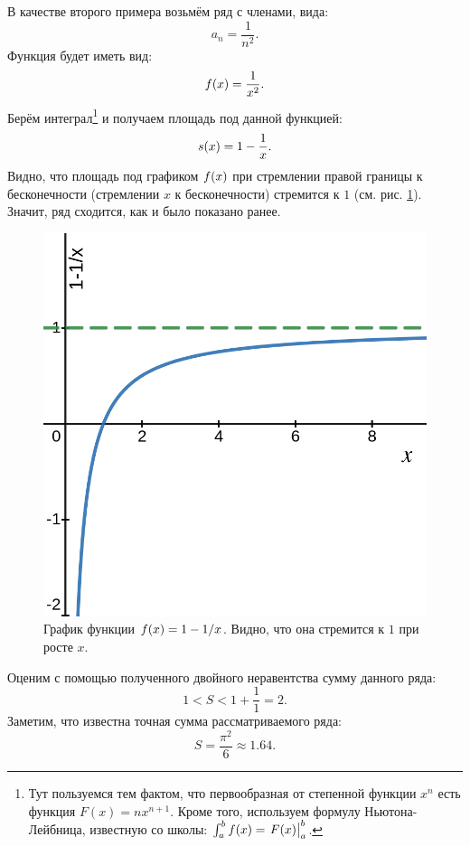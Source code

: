 \documentclass[12pt]{article}
\begin{document}
В качестве второго примера возьмём ряд с членами, вида:
\begin{equation}
    a_n = \dfrac{1}{n^2}.
\end{equation}
Функция будет иметь вид:
\begin{equation}
    f\qty(x) = \dfrac{1}{x^2}.
\end{equation}
Берём интеграл\footnote{Тут пользуемся тем фактом, что первообразная от степенной функции $x^n$ есть функция $F(x)=nx^{n+1}.$ Кроме того, используем формулу Ньютона\--Лейбница, известную со школы:
$ \int_a^b f\qty(x) = \eval{F\qty(x)}_a^b$.} и получаем площадь под данной функцией:
\begin{equation}
    s\qty(x) = 1 - \dfrac{1}{x}.
\end{equation}
Видно, что площадь под графиком $f\qty(x)$ при стремлении правой границы к бесконечности (стремлении $x$ к бесконечности) стремится к $1$ (см. рис. \ref{fig:9}). Значит, ряд сходится, как и было показано ранее. 
\begin{figure}[hbt]
    \centering
    \includegraphics[scale = 0.5]{fig9.png}
    \caption{График функции $f\qty(x) = 1 - 1/x$. Видно, что она стремится к $1$ при росте $x$.}
    \label{fig:9}
\end{figure}
Оценим с помощью полученного двойного неравентства сумму данного ряда:
\begin{equation}
    1 < S < 1 + \dfrac{1}{1} = 2.
\end{equation}
Заметим, что известна точная сумма рассматриваемого ряда:
\begin{equation}
    S = \dfrac{\pi^2}{6} \approx 1.64.
\end{equation}
\end{document}
